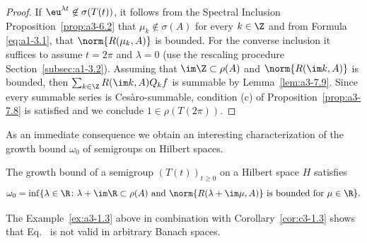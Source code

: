\begin{proof}
If\/ $\eu^{\lambda t} \not\in \sigma(T(t))$, it follows from the Spectral Inclusion Proposition~\ref{prop:a3-6.2} that $\mu_{k} \not\in \sigma(A)$ for every $k \in \Z$ and from Formula \eqref{eq:a1-3.1},  that $\norm{R(\mu_{k},A)}$ is bounded.
For the converse inclusion it suffices to assume $t = 2\pi$ and $\lambda = 0$ (use the rescaling procedure Section~\ref{subsec:a1-3.2}).
Assuming that $\im\Z \subset \rho(A)$ and $\norm{R(\im k,A)}$ is bounded, then $\sum_{k\in\Z} R(\im k,A)Q_{k}f$ is summable by Lemma~\ref{lem:a3-7.9}.
Since every summable series is Cesàro-summable, condition (c) of Proposition~\ref{prop:a3-7.8} is satisfied and we conclude $1 \in \rho(T(2\pi))$.
\end{proof}
As an immediate consequence we obtain an interesting characterization of the growth bound $\omega_{0}$ of semigroups on Hilbert spaces.
\begin{corollary}\label{cor:a3-7.11}
%
The growth bound 
of a semigroup $(T(t))_{t\geq 0}$ on a Hilbert space $H$ satisfies
\begin{equation}\label{eq:a3-7.9}
\omega_{0} = \inf \{\lambda \in \R \colon \lambda + \im\R \subset \rho(A) \text{ and } \norm{R(\lambda+\im\mu,A)} \text{ is bounded for } \mu \in \R\} .
\end{equation}
\end{corollary}
The Example~\ref{ex:a3-1.3} above in combination with Corollary~\ref{cor:c3-1.3} shows that Eq.~ is not valid in arbitrary Banach spaces.
